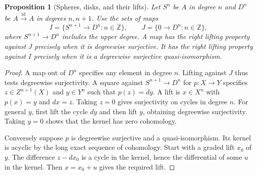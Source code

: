 \documentclass[11pt,oneside,openany]{book}
\newtheorem{proposition}[theorem]{Proposition}
\theoremstyle{definition}
\theoremstyle{remark}
\begin{document}
\begin{proposition}[Spheres, disks, and their lifts]\label{res:Q10}
Let \(S^n\) be \(A\) in degree \(n\) and \(D^n\) be
\(A\xrightarrow{\mathrm{id}} A\) in degrees \(n,n+1\).
Use the sets of maps
\[
 I=\{S^{n+1}\longrightarrow D^n:n\in\mathbb Z\},
 \qquad
 J=\{0\longrightarrow D^n:n\in\mathbb Z\},
\]
where \(S^{n+1}\to D^n\) includes the upper degree. A map has
the right lifting property against \(J\) precisely when it is
degreewise surjective. It has the right lifting property against
\(I\) precisely when it is a degreewise surjective quasi-isomorphism.
\end{proposition}
\begin{proof}
A map out of \(D^n\) specifies any element in degree \(n\).
Lifting against \(J\) thus tests degreewise surjectivity.
A square against \(S^{n+1}\to D^n\) for \(p:X\to Y\) specifies
\(z\in Z^{n+1}(X)\) and \(y\in Y^n\) such that \(p(z)=dy\).
A lift is \(x\in X^n\) with \(p(x)=y\) and \(dx=z\).
Taking \(z=0\) gives surjectivity on cycles in degree \(n\).
For general \(y\), first lift the cycle \(dy\) and then
lift \(y\), obtaining degreewise surjectivity. Taking \(y=0\)
shows that the kernel has zero cohomology.

Conversely suppose \(p\) is degreewise surjective and a
quasi-isomorphism. Its kernel is acyclic by the long exact
sequence of cohomology. Start with a graded lift \(x_0\) of
\(y\). The difference \(z-dx_0\) is a cycle in the kernel,
hence the differential of some \(u\) in the kernel. Then
\(x=x_0+u\) gives the required lift.
\end{proof}
\end{document}
